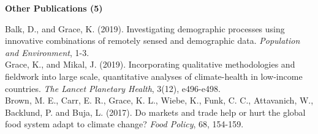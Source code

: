 \documentclass[11pt]{article} %
\begin{document}


























\noindent
\textbf {Other Publications (5)}

\noindent
Balk, D., and Grace, K. (2019). Investigating demographic processes using innovative combinations of remotely sensed and demographic data. \textit{Population and Environment}, 1-3.\\

\noindent
Grace, K., and Mikal, J. (2019). Incorporating qualitative methodologies and fieldwork into large scale, quantitative analyses of climate-health in low-income countries. \textit{The Lancet Planetary Health}, 3(12), e496-e498.\\

\noindent
Brown, M. E., Carr, E. R., Grace, K. L., Wiebe, K., Funk, C. C., Attavanich, W., Backlund, P. and Buja, L. (2017). Do markets and trade help or hurt the global food system adapt to climate change? \textit{Food Policy}, 68, 154-159.\\
\end{document}
